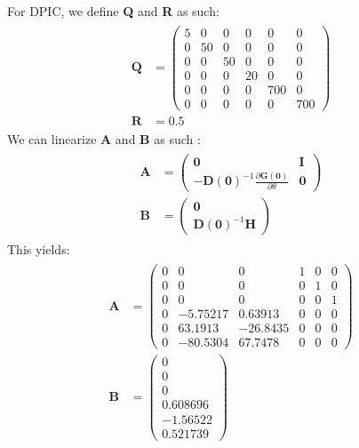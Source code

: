 \documentclass{article}
\theoremstyle{plain}
\theoremstyle{definition}
\theoremstyle{remark}
\begin{document}
For DPIC, we define \textbf{Q} and \textbf{R} as such:
\begin{gather*}
    \begin{aligned}
        \textbf{Q} &= \begin{pmatrix}
            5 & 0 & 0 & 0 & 0 & 0 \\
            0 & 50 & 0 & 0 & 0 & 0 \\
            0 & 0 & 50 & 0 & 0 & 0 \\
            0 & 0 & 0 & 20 & 0 & 0 \\
            0 & 0 & 0 & 0 & 700 & 0 \\
            0 & 0 & 0 & 0 & 0 & 700
        \end{pmatrix} \\
        \textbf{R} &= 0.5
    \end{aligned}
\end{gather*}
We can linearize \textbf{A} and \textbf{B} as such \cite{DIPCShort}:
\begin{gather*}
    \begin{aligned}
        \textbf{A} &= \begin{pmatrix}
            \textbf{0} & \textbf{I} \\
            -\textbf{D}(\textbf{0})^{-1}\frac{\partial\textbf{G}(\textbf{0})}{\partial\theta} & \textbf{0}
        \end{pmatrix} \\
        \textbf{B} &= \begin{pmatrix}
            \textbf{0} \\
            \textbf{D}(\textbf{0})^{-1}\textbf{H}
        \end{pmatrix}
    \end{aligned}
\end{gather*}
This yields:
\begin{gather*}
    \begin{aligned}
        \textbf{A} &= \begin{pmatrix}
            0 & 0 & 0 & 1 & 0 & 0 \\
            0 & 0 & 0 & 0 & 1 & 0 \\
            0 & 0 & 0 & 0 & 0 & 1 \\
            0 & -5.75217 & 0.63913 & 0 & 0 & 0 \\
            0 & 63.1913 & -26.8435 & 0 & 0 & 0 \\
            0 & -80.5304 & 67.7478 & 0 & 0 & 0
        \end{pmatrix} \\
        \textbf{B} &= \begin{pmatrix}
            0 \\
            0 \\
            0 \\
            0.608696 \\
            -1.56522 \\
            0.521739
        \end{pmatrix}
    \end{aligned}
\end{gather*}
\end{document}
